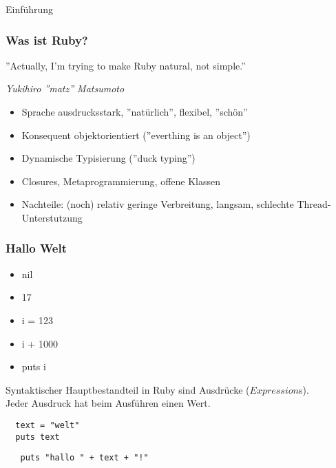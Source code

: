 \documentclass{beamer}
\begin{document}
\lstset{language=Ruby}
\lstset{basicstyle=\small,numbers=none, numberstyle=\tiny, numbersep=5pt}

\begin{frame}{Einführung}
\frametitle{Was ist Ruby?}

\begin{center}
''Actually, I'm trying to make Ruby natural, not simple.'' 
\end{center}
\begin{flushright}
\emph{Yukihiro ''matz'' Matsumoto}
\end{flushright}



\begin{itemize}
\pause \item Sprache ausdrucksstark\pause, ''natürlich''\pause, flexibel\pause, ''schön''
\pause \item Konsequent objektorientiert (''everthing is an object'')
\pause \item Dynamische Typisierung (''duck typing'')
\pause \item Closures, Metaprogrammierung, offene Klassen
\pause \item Nachteile: (noch) relativ geringe Verbreitung\pause,  langsam\pause, 
              schlechte Thread-Unterstutzung
\end{itemize}
\end{frame}

\begin{frame}[fragile]
  \frametitle{Hallo Welt}
  \begin{itemize}[<+->]
  \item nil
  \item 17
  \item i = 123
  \item i + 1000
  \item puts i
  \end{itemize}
  \pause
  Syntaktischer Hauptbestandteil in Ruby sind Ausdrücke ($Expression$s).\\
  Jeder Ausdruck hat beim Ausführen einen Wert.\\
  \pause
  \begin{lstlisting}
  text = "welt"
  puts text
  \end{lstlisting}
  \pause
  \lstinline|   puts "hallo " + text + "!"|
  

\begin{comment}
  \pause
  \lstinline|   puts "hallo #{text}!"| \hspace{5em}  (``String-Interpolation'')
\end{comment}

\end{frame}
\end{document}
